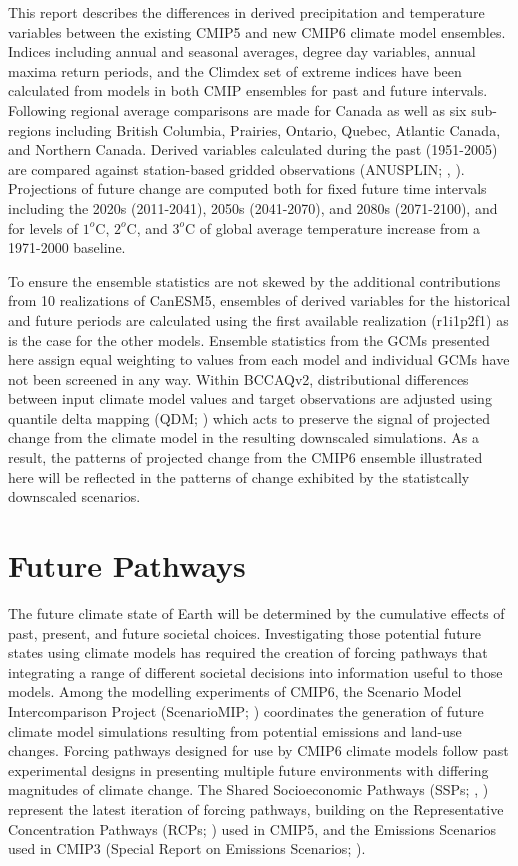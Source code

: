 \documentclass[]{scrartcl}
\begin{document}
This report describes the differences in derived precipitation and temperature variables between the existing CMIP5 and new CMIP6 climate model ensembles. Indices including annual and seasonal averages, degree day variables, annual maxima return periods, and the Climdex set of extreme indices \citep{Zhang2011} have been calculated from models in both CMIP ensembles for past and future intervals. Following \cite{zhang_change_2019} regional average comparisons are made for Canada as well as six sub-regions including British Columbia, Prairies, Ontario, Quebec, Atlantic Canada, and Northern Canada. Derived variables calculated during the past (1951-2005) are compared against station-based gridded observations (ANUSPLIN; \citealt{Hopkinson2012}, \citealt{McKenney2011}). Projections of future change are computed both for fixed future time intervals including the 2020s (2011-2041), 2050s (2041-2070), and 2080s (2071-2100), and for levels of $1^o$C, $2^o$C, and $3^o$C of global average temperature increase from a 1971-2000 baseline. 

To ensure the ensemble statistics are not skewed by the additional contributions from 10 realizations of CanESM5, ensembles of derived variables for the historical and future periods are calculated using the first available realization (r1i1p2f1) as is the case for the other models. Ensemble statistics from the GCMs presented here assign equal weighting to values from each model and individual GCMs have not been screened in any way. Within BCCAQv2, distributional differences between input climate model values and target observations are adjusted using quantile delta mapping (QDM; \citealt{cannon_bias_2015}) which acts to preserve the signal of projected change from the climate model in the resulting downscaled simulations. As a result, the patterns of projected change from the CMIP6 ensemble illustrated here will be reflected in the patterns of change exhibited by the statistcally downscaled scenarios. 

\section{Future Pathways}
The future climate state of Earth will be determined by the cumulative effects of past, present, and future societal choices. Investigating those potential future states using climate models has required the creation of forcing pathways that integrating a range of different societal decisions into information useful to those models. Among the modelling experiments of CMIP6, the Scenario Model Intercomparison Project (ScenarioMIP; \citealt{oneill_scenario_2016}) coordinates the generation of future climate model simulations resulting from potential emissions and land-use changes. Forcing pathways designed for use by CMIP6 climate models follow past experimental designs in presenting multiple future environments with differing magnitudes of climate change. The Shared Socioeconomic Pathways (SSPs; \citealt{gidden_global_2019}, \citealt{Riahi2017}) represent the latest iteration of forcing pathways, building on the Representative Concentration Pathways (RCPs; \citealt{Vuuren2011}) used in CMIP5, and the Emissions Scenarios used in CMIP3 (Special Report on Emissions Scenarios; \citealt{Nakicenovic2000}). 
 
\end{document}
